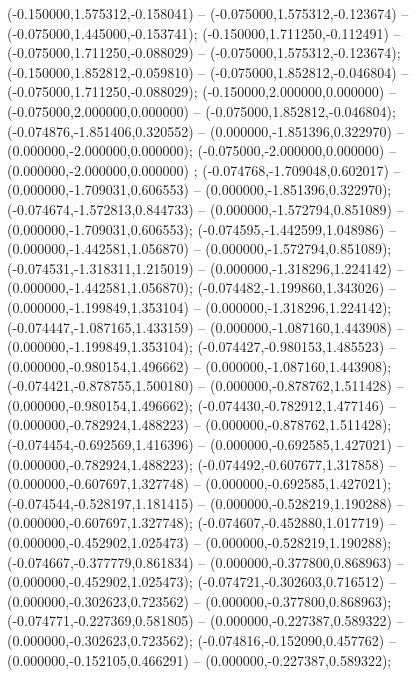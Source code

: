  (-0.150000,1.575312,-0.158041) -- (-0.075000,1.575312,-0.123674) -- (-0.075000,1.445000,-0.153741);
 (-0.150000,1.711250,-0.112491) -- (-0.075000,1.711250,-0.088029) -- (-0.075000,1.575312,-0.123674);
 (-0.150000,1.852812,-0.059810) -- (-0.075000,1.852812,-0.046804) -- (-0.075000,1.711250,-0.088029);
 (-0.150000,2.000000,0.000000) -- (-0.075000,2.000000,0.000000) -- (-0.075000,1.852812,-0.046804);
 (-0.074876,-1.851406,0.320552) -- (0.000000,-1.851396,0.322970) -- (0.000000,-2.000000,0.000000);
 (-0.075000,-2.000000,0.000000) -- (0.000000,-2.000000,0.000000) ;
 (-0.074768,-1.709048,0.602017) -- (0.000000,-1.709031,0.606553) -- (0.000000,-1.851396,0.322970);
 (-0.074674,-1.572813,0.844733) -- (0.000000,-1.572794,0.851089) -- (0.000000,-1.709031,0.606553);
 (-0.074595,-1.442599,1.048986) -- (0.000000,-1.442581,1.056870) -- (0.000000,-1.572794,0.851089);
 (-0.074531,-1.318311,1.215019) -- (0.000000,-1.318296,1.224142) -- (0.000000,-1.442581,1.056870);
 (-0.074482,-1.199860,1.343026) -- (0.000000,-1.199849,1.353104) -- (0.000000,-1.318296,1.224142);
 (-0.074447,-1.087165,1.433159) -- (0.000000,-1.087160,1.443908) -- (0.000000,-1.199849,1.353104);
 (-0.074427,-0.980153,1.485523) -- (0.000000,-0.980154,1.496662) -- (0.000000,-1.087160,1.443908);
 (-0.074421,-0.878755,1.500180) -- (0.000000,-0.878762,1.511428) -- (0.000000,-0.980154,1.496662);
 (-0.074430,-0.782912,1.477146) -- (0.000000,-0.782924,1.488223) -- (0.000000,-0.878762,1.511428);
 (-0.074454,-0.692569,1.416396) -- (0.000000,-0.692585,1.427021) -- (0.000000,-0.782924,1.488223);
 (-0.074492,-0.607677,1.317858) -- (0.000000,-0.607697,1.327748) -- (0.000000,-0.692585,1.427021);
 (-0.074544,-0.528197,1.181415) -- (0.000000,-0.528219,1.190288) -- (0.000000,-0.607697,1.327748);
 (-0.074607,-0.452880,1.017719) -- (0.000000,-0.452902,1.025473) -- (0.000000,-0.528219,1.190288);
 (-0.074667,-0.377779,0.861834) -- (0.000000,-0.377800,0.868963) -- (0.000000,-0.452902,1.025473);
 (-0.074721,-0.302603,0.716512) -- (0.000000,-0.302623,0.723562) -- (0.000000,-0.377800,0.868963);
 (-0.074771,-0.227369,0.581805) -- (0.000000,-0.227387,0.589322) -- (0.000000,-0.302623,0.723562);
 (-0.074816,-0.152090,0.457762) -- (0.000000,-0.152105,0.466291) -- (0.000000,-0.227387,0.589322);
